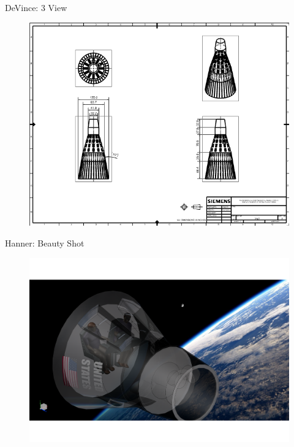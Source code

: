 \documentclass[10pt]{beamer}
\begin{document}
\begin{frame}{DeVince: 3 View}
\begin{figure}
\centering
\includegraphics[width=\textwidth]{DeVince_3_View.png}
\end{figure}
\end{frame}

	\begin{frame}{Hanner: Beauty Shot}
\begin{figure}
	\centering
	\includegraphics[width=\textwidth]{Hanner_Beauty.png}
\end{figure}
\end{frame}
\end{document}
